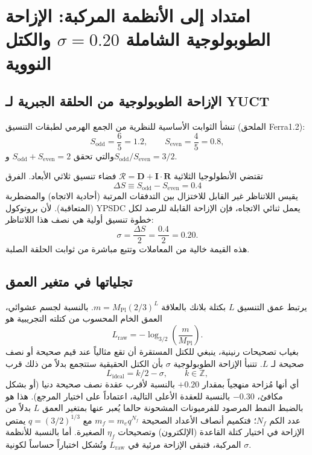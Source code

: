 \documentclass[12pt,a4paper]{article}
\begin{document}
	\section{امتداد إلى الأنظمة المركبة: الإزاحة الطوبولوجية الشاملة \(\sigma=0.20\) والكتل النووية}
	\label{sec:sigma_nuclear}
	
	\subsection{الإزاحة الطوبولوجية من الحلقة الجبرية لـ YUCT}
	تنشأ الثوابت الأساسية للنظرية من الجمع الهرمي لطبقات التنسيق (الملحق Ferra1.2):
	\[
	S_{\mathrm{odd}} = \frac{6}{5}=1.2,\qquad S_{\mathrm{even}} = \frac{4}{5}=0.8,
	\]
	والتي تحقق \(S_{\mathrm{odd}}+S_{\mathrm{even}}=2\) و\(S_{\mathrm{odd}}/S_{\mathrm{even}}=3/2\).
	
	تقتضي الأنطولوجيا الثلاثية \(\mathcal{R} = \mathbf{D} + \mathbf{I}\!\cdot\!\mathbf{R}\) فضاء تنسيق ثلاثي الأبعاد. الفرق
	\[
	\Delta S \equiv S_{\mathrm{odd}} - S_{\mathrm{even}} = 0.4
	\]
	يقيس اللاتناظر غير القابل للاختزال بين التدفقات المرتبة (أحادية الاتجاه) والمضطربة (المتعاقبة). لأن بروتوكول YPSDC يعمل ثنائي الاتجاه، فإن الإزاحة القابلة للرصد لكل خطوة تنسيق أولية هي نصف هذا اللاتناظر:
	\begin{equation}
		\boxed{\sigma = \frac{\Delta S}{2} = \frac{0.4}{2} = 0.20.}
		\label{eq:sigma_fermion_paper}
	\end{equation}
	هذه القيمة خالية من المعاملات وتتبع مباشرة من ثوابت الحلقة الصلبة.
	
	\subsection{تجلياتها في متغير العمق}
	يرتبط عمق التنسيق \(L\) بكتلة بلانك بالعلاقة \(m = M_{\mathrm{Pl}}(2/3)^L\). بالنسبة لجسم عشوائي، العمق الخام المحسوب من كتلته التجريبية هو
	\begin{equation}
		L_{\mathrm{raw}} = -\log_{3/2}\!\left(\frac{m}{M_{\mathrm{Pl}}}\right).
	\end{equation}
	بغياب تصحيحات رنينية، ينبغي للكتل المستقرة أن تقع مثالياً عند قيم صحيحة أو نصف صحيحة لـ \(L\). تتنبأ الإزاحة الطوبولوجية \(\sigma\) بأن الكتل الحقيقية ستتجمع بدلاً من ذلك قرب
	\[
	L_{\mathrm{ideal}} = k/2 - \sigma, \qquad k\in\mathbb{Z},
	\]
	أي أنها مُزاحة منهجياً بمقدار \(+0.20\) بالنسبة لأقرب عقدة نصف صحيحة دنيا (أو بشكل مكافئ، \(-0.30\) بالنسبة للعقدة الأعلى التالية، اعتماداً على اختيار المرجع). هذا هو بالضبط النمط المرصود للفرميونات المشحونة حالما يُعبر عنها بمتغير العمق \(L\) بدلاً من عدد الكم \(N_f\)؛ فتكميم أنصاف الأعداد الصحيحة \(m_f = m_e q^{N_f}\) مع \(q=(3/2)^{1/3}\) يمتص الإزاحة في اختيار كتلة القاعدة (الإلكترون) وتصحيحات \(\eta_f\) الصغيرة. أما بالنسبة للأنظمة المركبة، فتبقى الإزاحة مرئية في \(L_{\mathrm{raw}}\) وتُشكل اختباراً حساساً لكونية \(\sigma\).
	
\end{document}
